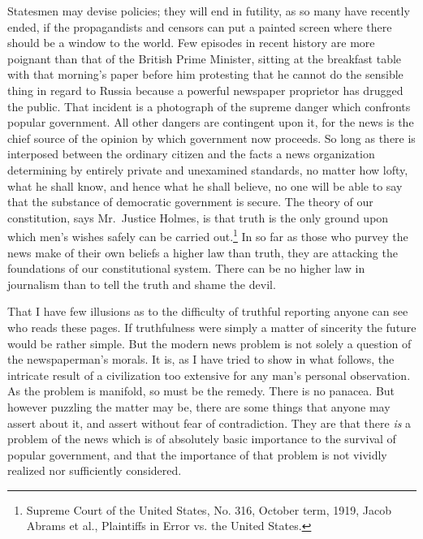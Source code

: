\documentclass[openany,nobib,nohyper]{tufte-book}
\begin{document}
Statesmen may devise policies; they will end in futility, as so many
have recently ended, if the propagandists and censors can put a painted
screen where there should be a window to the world. Few episodes in
recent history are more poignant than that of the British Prime
Minister, sitting at the breakfast table with that morning's paper
before him protesting that he cannot do the sensible thing in regard to
Russia because a powerful newspaper proprietor has drugged the public.
That incident is a photograph of the supreme danger which confronts
popular government. All other dangers are contingent upon it, for the
news is the chief source of the opinion by which government now
proceeds. So long as there is interposed between the ordinary citizen
and the facts a news organization determining by entirely private and
unexamined standards, no matter how lofty, what he shall know, and hence
what he shall believe, no one will be able to say that the substance of
democratic government is secure. The theory of our constitution, says
Mr.~Justice Holmes, is that truth is the only ground upon which men's
wishes safely can be carried out.\footnote{Supreme Court of the United States, No. 316, October term, 1919, Jacob
  Abrams et al., Plaintiffs in Error vs. the United States.}
In so far as those who purvey the news make of their own beliefs a
higher law than truth, they are attacking the foundations of our
constitutional system. There can be no higher law in journalism than to
tell the truth and shame the devil.

That I have few illusions as to the difficulty of truthful reporting
anyone can see who reads these pages. If truthfulness were simply a
matter of sincerity the future would be rather simple. But the modern
news problem is not solely a question of the newspaperman's morals. It
is, as I have tried to show in what follows, the intricate result of a
civilization too extensive for any man's personal observation. As the
problem is manifold, so must be the remedy. There is no panacea. But
however puzzling the matter may be, there are some things that anyone
may assert about it, and assert without fear of contradiction. They are
that there \emph{is} a problem of the news which is of absolutely basic
importance to the survival of popular government, and that the
importance of that problem is not vividly realized nor sufficiently
considered.
\end{document}
